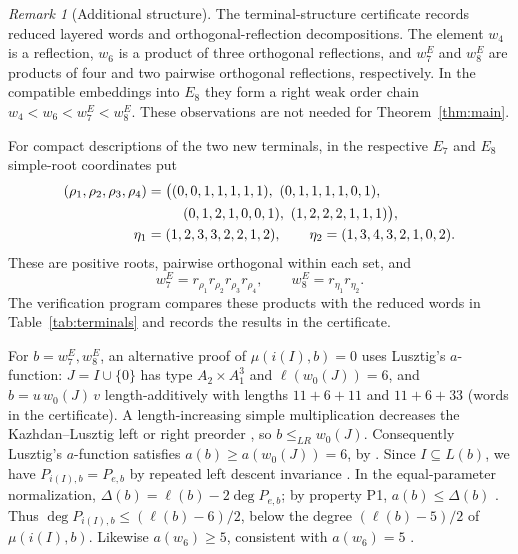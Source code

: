 \documentclass[10pt]{article}
\theoremstyle{remark}
\newtheorem{remark}[theorem]{Remark}
\begin{document}
\begin{remark}[Additional structure]\label{rem:structure}
The terminal-structure certificate records reduced layered words and
orthogonal-reflection decompositions. The element $w_4$ is a reflection,
$w_6$ is a product of three orthogonal reflections, and $w_7^{E}$ and
$w_8^{E}$ are products of four and two pairwise orthogonal reflections,
respectively. In the compatible
embeddings into $E_8$ they form a right weak order chain
$w_4<w_6<w_7^{E}<w_8^{E}$. These observations are not needed for
Theorem~\ref{thm:main}.

For compact descriptions of the two new terminals, in the respective
$E_7$ and $E_8$ simple-root coordinates put
\[
\begin{split}
 (\rho_1,\rho_2,\rho_3,\rho_4)
 &=\bigl((0,0,1,1,1,1,1),\ (0,1,1,1,1,0,1),\\
 &\hspace{2.6em}(0,1,2,1,0,0,1),\ (1,2,2,2,1,1,1)\bigr),\\
 \eta_1&=(1,2,3,3,2,2,1,2),\qquad
 \eta_2=(1,3,4,3,2,1,0,2).
\end{split}
\]
These are positive roots, pairwise orthogonal within each set, and
\[
 w_7^{E}=r_{\rho_1}r_{\rho_2}r_{\rho_3}r_{\rho_4},\qquad
 w_8^{E}=r_{\eta_1}r_{\eta_2}.
\]
The verification program compares these products with the reduced words
in Table~\ref{tab:terminals} and records the results in the certificate.

For $b=w_7^{E},w_8^{E}$, an alternative proof of $\mu(i(I),b)=0$
uses Lusztig's $a$-function: $J=I\cup\{0\}$ has type
$A_2\times A_1^3$ and $\ell(w_0(J))=6$, and $b=u\,w_0(J)\,v$
length-additively with lengths $11+6+11$ and $11+6+33$ (words in the
certificate). A length-increasing simple multiplication decreases the
Kazhdan--Lusztig left or right preorder \cite[\S2]{GeckHalls}, so
$b\leq_{LR}w_0(J)$. Consequently Lusztig's $a$-function satisfies
$a(b)\geq a(w_0(J))=6$, by \cite[Proposition~13.8 and properties
P4, P12 of \S14.2, proved in Chapter~15]{LusztigUP}.
Since $I\subseteq L(b)$, we have $P_{i(I),b}=P_{e,b}$ by repeated
left descent invariance \cite[Proposition~5.1.8 and its left analogue]{BB}.
In the equal-parameter normalization, $\Delta(b)=\ell(b)-2\deg P_{e,b}$;
by property P1, $a(b)\leq\Delta(b)$ \cite[\S14.1 and \S15.2]{LusztigUP}.
Thus $\deg P_{i(I),b}\leq(\ell(b)-6)/2$, below the degree
$(\ell(b)-5)/2$ of $\mu(i(I),b)$. Likewise $a(w_6)\geq5$,
consistent with $a(w_6)=5$ \cite[Proposition~4.5.1]{Gern}.
\end{remark}
\end{document}
